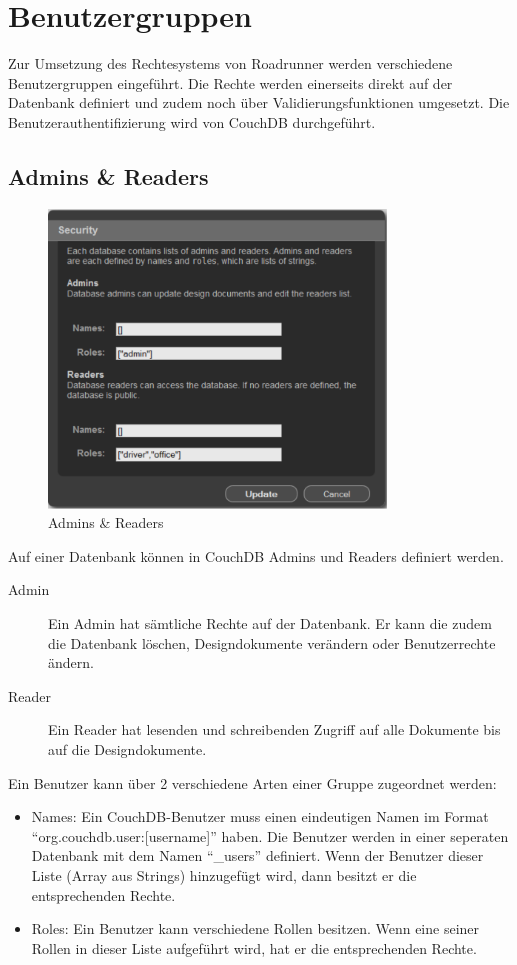 \section{Benutzergruppen}

Zur Umsetzung des Rechtesystems von Roadrunner werden verschiedene Benutzergruppen eingeführt. Die Rechte werden einerseits direkt auf der Datenbank definiert und zudem noch über Validierungsfunktionen umgesetzt. Die Benutzerauthentifizierung wird von CouchDB durchgeführt.

\subsection{Admins \& Readers}

\begin{figure}
	\centering
		\includegraphics[width=0.8\textwidth]{files/pdf/security.pdf}
	\caption{Admins \& Readers}
	\label{fig:security}
\end{figure}

Auf einer Datenbank können in CouchDB Admins und Readers definiert werden. 
\begin{description}
\item[Admin] Ein Admin hat sämtliche Rechte auf der Datenbank. Er kann die zudem die Datenbank löschen, Designdokumente verändern oder Benutzerrechte ändern.
\item[Reader] Ein Reader hat lesenden und schreibenden Zugriff auf alle Dokumente bis auf die Designdokumente.
\end{description}

\noindent Ein Benutzer kann über 2 verschiedene Arten einer Gruppe zugeordnet werden:
 \begin{itemize}
\item Names: Ein CouchDB-Benutzer muss einen eindeutigen Namen im Format "`org.couchdb.user:[username]"' haben. Die Benutzer werden in einer seperaten Datenbank mit dem Namen "`\_users"' definiert. Wenn der Benutzer dieser Liste (Array aus Strings) hinzugefügt wird, dann besitzt er die entsprechenden Rechte.
\item Roles: Ein Benutzer kann verschiedene Rollen besitzen. Wenn eine seiner Rollen in dieser Liste aufgeführt wird, hat er die entsprechenden Rechte. 
\end{itemize}

